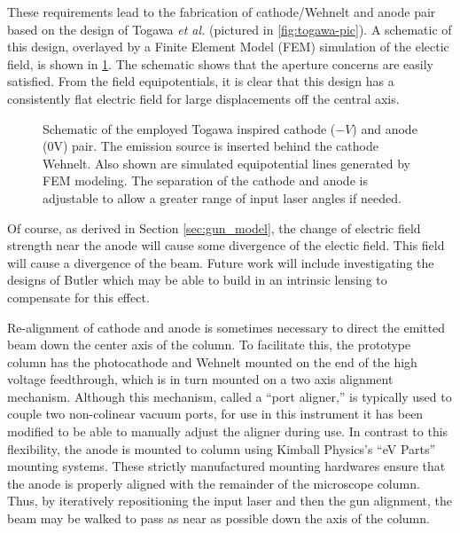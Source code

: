 These requirements lead to the fabrication of cathode/Wehnelt and anode pair based on the design of Togawa \textit{et al.} \cite{togawa_ceb6_2007} (pictured in \ref{fig:togawa-pic}).
A schematic of this design, overlayed by a Finite Element Model (FEM) simulation of the electic field, is shown in \ref{fig:gun-field}.
The schematic shows that the aperture concerns are easily satisfied.
From the field equipotentials, it is clear that this design has a consistently flat electric field for large displacements off the central axis.

\begin{figure}
  \centering
  
  \caption{
    Schematic of the employed Togawa inspired cathode ($-V$) and anode (0V) pair.
    The emission source is inserted behind the cathode Wehnelt.
    Also shown are simulated equipotential lines generated by FEM modeling.
    The separation of the cathode and anode is adjustable to allow a greater range of input laser angles if needed. 
  }
  \label{fig:gun-field}
\end{figure}

Of course, as derived in Section \ref{sec:gun_model}, the change of electric field strength near the anode will cause some divergence of the electic field.
This field will cause a divergence of the beam.
Future work will include investigating the designs of Butler %
which may be able to build in an intrinsic lensing to compensate for this effect.


Re-alignment of cathode and anode is sometimes necessary to direct the emitted beam down the center axis of the column.
To facilitate this, the prototype column has the photocathode and Wehnelt mounted on the end of the high voltage feedthrough, which is in turn mounted on a two axis alignment mechanism.
Although this mechanism, called a ``port aligner,'' is typically used to couple two non-colinear vacuum ports, for use in this instrument it has been modified to be able to manually adjust the aligner during use.
In contrast to this flexibility, the anode is mounted to column using Kimball Physics's ``eV Parts'' mounting systems.
These strictly manufactured mounting hardwares ensure that the anode is properly aligned with the remainder of the microscope column.
Thus, by iteratively repositioning the input laser and then the gun alignment, the beam may be walked to pass as near as possible down the axis of the column.

